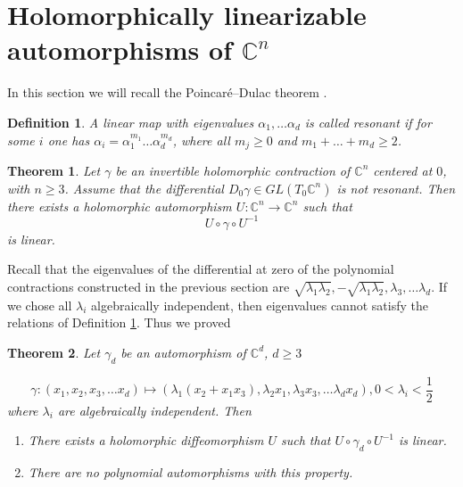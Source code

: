 \documentclass[12pt]{article}
\newtheorem{definition}{Definition}
\newtheorem{theorem}{Theorem}
\begin{document}
\section{Holomorphically linearizable automorphisms of $\mathbb C^n$}

In this section we will recall the Poincar\'e--Dulac theorem \cite[Theorem 27.38]{OVM}. 

\begin{definition}
\label{resonance}
A linear map with eigenvalues $\alpha_1,\dots \alpha_d $ is called resonant if for some $ i $ one has $ \alpha_i=\alpha_1^{m_1}\dots \alpha_d^{m_d} $, where all $ m_j\ge 0$ and $m_1+\dots +m_d \ge  2$. 
\end{definition}

\begin{theorem}
Let $\gamma$ be an invertible holomorphic contraction of $\mathbb C^n$ centered at $0$, with $n \ge 3$. Assume that the differential
$D_0\gamma \in GL(T_0\mathbb{C}^n)$
is not resonant. Then there exists a holomorphic automorphism
$U : \mathbb{C}^n \to \mathbb{C}^n$ 
such that
\[
U \circ \gamma \circ U^{-1}
\]
is linear.
\end{theorem}

Recall that the eigenvalues of the differential at zero of the polynomial contractions constructed in the previous section are $\sqrt{\lambda_1\lambda_2}, -\sqrt{\lambda_1\lambda_2}, \lambda_3,\dots \lambda_d $. If we chose all $ \lambda_i $ algebraically independent, then eigenvalues cannot satisfy the relations of Definition \ref{resonance}. Thus we proved

\begin{theorem}
Let $ \gamma_d $ be an automorphism of $\mathbb C^d$, $d\ge 3$

$$\gamma: (x_1,x_2,x_3,\dots x_d)\mapsto  \left(\lambda_1(x_2+x_1x_3),\lambda_2 x_1,\lambda_3 x_3,\dots \lambda_d x_d \right), 0<\lambda_i<\frac{1}{2} $$
where $ \lambda_i $ are algebraically independent.  Then
\begin{enumerate}

\item There exists a holomorphic diffeomorphism $ U $ such that $ U\circ\gamma_d\circ U^{-1} $ is linear.
\item There are no polynomial automorphisms with this property.
\end{enumerate}
\end{theorem}



\end{document}
